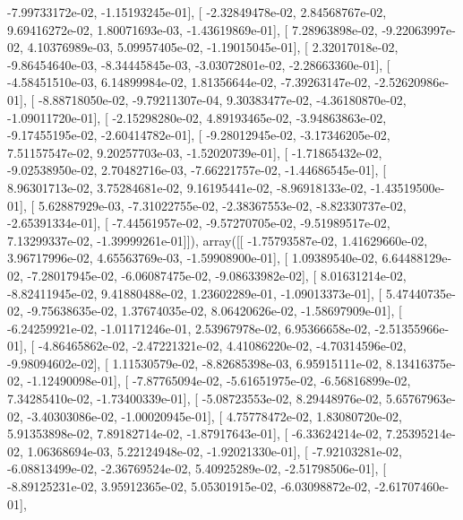 \documentclass{article}
\begin{document}
         -7.99733172e-02,  -1.15193245e-01],
       [ -2.32849478e-02,   2.84568767e-02,   9.69416272e-02,
          1.80071693e-03,  -1.43619869e-01],
       [  7.28963898e-02,  -9.22063997e-02,   4.10376989e-03,
          5.09957405e-02,  -1.19015045e-01],
       [  2.32017018e-02,  -9.86454640e-03,  -8.34445845e-03,
         -3.03072801e-02,  -2.28663360e-01],
       [ -4.58451510e-03,   6.14899984e-02,   1.81356644e-02,
         -7.39263147e-02,  -2.52620986e-01],
       [ -8.88718050e-02,  -9.79211307e-04,   9.30383477e-02,
         -4.36180870e-02,  -1.09011720e-01],
       [ -2.15298280e-02,   4.89193465e-02,  -3.94863863e-02,
         -9.17455195e-02,  -2.60414782e-01],
       [ -9.28012945e-02,  -3.17346205e-02,   7.51157547e-02,
          9.20257703e-03,  -1.52020739e-01],
       [ -1.71865432e-02,  -9.02538950e-02,   2.70482716e-03,
         -7.66221757e-02,  -1.44686545e-01],
       [  8.96301713e-02,   3.75284681e-02,   9.16195441e-02,
         -8.96918133e-02,  -1.43519500e-01],
       [  5.62887929e-03,  -7.31022755e-02,  -2.38367553e-02,
         -8.82330737e-02,  -2.65391334e-01],
       [ -7.44561957e-02,  -9.57270705e-02,  -9.51989517e-02,
          7.13299337e-02,  -1.39999261e-01]]), array([[ -1.75793587e-02,   1.41629660e-02,   3.96717996e-02,
          4.65563769e-03,  -1.59908900e-01],
       [  1.09389540e-02,   6.64488129e-02,  -7.28017945e-02,
         -6.06087475e-02,  -9.08633982e-02],
       [  8.01631214e-02,  -8.82411945e-02,   9.41880488e-02,
          1.23602289e-01,  -1.09013373e-01],
       [  5.47440735e-02,  -9.75638635e-02,   1.37674035e-02,
          8.06420626e-02,  -1.58697909e-01],
       [ -6.24259921e-02,  -1.01171246e-01,   2.53967978e-02,
          6.95366658e-02,  -2.51355966e-01],
       [ -4.86465862e-02,  -2.47221321e-02,   4.41086220e-02,
         -4.70314596e-02,  -9.98094602e-02],
       [  1.11530579e-02,  -8.82685398e-03,   6.95915111e-02,
          8.13416375e-02,  -1.12490098e-01],
       [ -7.87765094e-02,  -5.61651975e-02,  -6.56816899e-02,
          7.34285410e-02,  -1.73400339e-01],
       [ -5.08723553e-02,   8.29448976e-02,   5.65767963e-02,
         -3.40303086e-02,  -1.00020945e-01],
       [  4.75778472e-02,   1.83080720e-02,   5.91353898e-02,
          7.89182714e-02,  -1.87917643e-01],
       [ -6.33624214e-02,   7.25395214e-02,   1.06368694e-03,
          5.22124948e-02,  -1.92021330e-01],
       [ -7.92103281e-02,  -6.08813499e-02,  -2.36769524e-02,
          5.40925289e-02,  -2.51798506e-01],
       [ -8.89125231e-02,   3.95912365e-02,   5.05301915e-02,
         -6.03098872e-02,  -2.61707460e-01],
\end{document}
